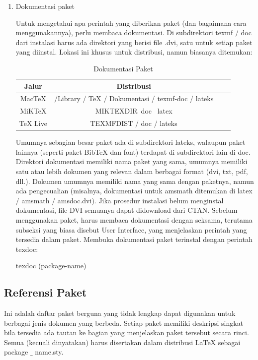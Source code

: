 \begin{enumerate}
\vspace{12pt}
\item Dokumentasi paket \par
\hspace{0.50in} Untuk mengetahui apa perintah yang diberikan paket (dan bagaimana cara menggunakannya), perlu membaca dokumentasi. Di subdirektori texmf / doc dari instalasi harus ada direktori yang berisi file .dvi, satu untuk setiap paket yang diinstal. Lokasi ini khusus untuk distribusi, namun biasanya ditemukan:\par

\begin{table}[ht]
	\caption{Dokumentasi Paket}
	\centering
	\begin{tabular}{cccc}
		\hline
		Jalur&Distribusi\\
		\hline
		MacTeX &/Library / TeX / Dokumentasi / texmf-doc / lateks&\\
		MiKTeX&MIKTEXDIR\ doc \ latex&\\
		TeX Live&TEXMFDIST / doc / lateks&\\
		\hline
	\end{tabular}
\end{table}

\hspace{0.50in} Umumnya sebagian besar paket ada di subdirektori lateks, walaupun paket lainnya (seperti paket BibTeX dan font) terdapat di subdirektori lain di doc. Direktori dokumentasi memiliki nama paket yang sama, umumnya memiliki satu atau lebih dokumen yang relevan dalam berbagai format (dvi, txt, pdf, dll.). Dokumen umumnya memiliki nama yang sama dengan paketnya, namun ada pengecualian (misalnya, dokumentasi untuk amsmath ditemukan di latex / amsmath / amsdoc.dvi). Jika prosedur instalasi belum menginstal dokumentasi, file DVI semuanya dapat didownload dari CTAN. Sebelum menggunakan paket, harus membaca dokumentasi dengan seksama, terutama subseksi yang biasa disebut User Interface, yang menjelaskan perintah yang tersedia dalam paket. Membuka dokumentasi paket terinstal dengan perintah texdoc: \par
texdoc (package-name)\par
\end{enumerate}

\subsection {Referensi Paket}\par
\hspace{0.50in} Ini adalah daftar paket berguna yang tidak lengkap dapat digunakan untuk berbagai jenis dokumen yang berbeda. Setiap paket memiliki deskripsi singkat bila tersedia ada tautan ke bagian yang menjelaskan paket tersebut secara rinci. Semua (kecuali dinyatakan) harus disertakan dalam distribusi LaTeX sebagai package $ \_ $ name.sty. 

